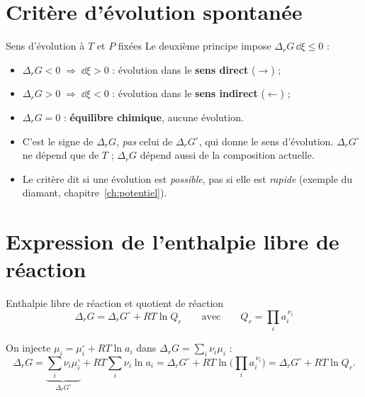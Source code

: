 \section{Critère d'évolution spontanée}

\begin{resultat}{Sens d'évolution à $T$ et $P$ fixées}
Le deuxième principe impose $\Delta_rG\,\dd\xi \leq 0$ :
\begin{itemize}
  \item $\Delta_rG < 0 \;\Rightarrow\; \dd\xi > 0$ : évolution dans le \textbf{sens direct} ($\rightarrow$) ;
  \item $\Delta_rG > 0 \;\Rightarrow\; \dd\xi < 0$ : évolution dans le \textbf{sens indirect} ($\leftarrow$) ;
  \item $\Delta_rG = 0$ : \textbf{équilibre chimique}, aucune évolution.
\end{itemize}
\end{resultat}

\begin{pieges}
\begin{itemize}
  \item C'est le signe de $\Delta_rG$, \emph{pas} celui de $\Delta_rG^\circ$, qui donne le sens d'évolution. $\Delta_rG^\circ$ ne dépend que de $T$ ; $\Delta_rG$ dépend aussi de la composition actuelle.
  \item Le critère dit si une évolution est \emph{possible}, pas si elle est \emph{rapide} (exemple du diamant, chapitre~\ref{ch:potentiel}).
\end{itemize}
\end{pieges}

\section{Expression de l'enthalpie libre de réaction}

\begin{resultat}{Enthalpie libre de réaction et quotient de réaction}
\[ \boxed{\Delta_rG = \Delta_rG^\circ + RT\ln Q_r} \qquad\text{avec}\qquad Q_r = \prod_i a_i^{\,\nu_i} \]
\end{resultat}

\begin{demo}
On injecte $\mu_i = \mu_i^\circ + RT\ln a_i$ dans $\Delta_rG = \sum_i\nu_i\mu_i$ :
\[ \Delta_rG = \underbrace{\sum_i\nu_i\mu_i^\circ}_{\Delta_rG^\circ} + RT\sum_i\nu_i\ln a_i = \Delta_rG^\circ + RT\ln\Big(\prod_i a_i^{\,\nu_i}\Big) = \Delta_rG^\circ + RT\ln Q_r. \]
\end{demo}

